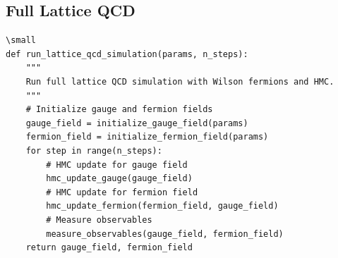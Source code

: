 \documentclass[12pt]{article}
\begin{document}
\subsection{Full Lattice QCD}
\begin{verbatim}
\small
def run_lattice_qcd_simulation(params, n_steps):
    """
    Run full lattice QCD simulation with Wilson fermions and HMC.
    """
    # Initialize gauge and fermion fields
    gauge_field = initialize_gauge_field(params)
    fermion_field = initialize_fermion_field(params)
    for step in range(n_steps):
        # HMC update for gauge field
        hmc_update_gauge(gauge_field)
        # HMC update for fermion field
        hmc_update_fermion(fermion_field, gauge_field)
        # Measure observables
        measure_observables(gauge_field, fermion_field)
    return gauge_field, fermion_field
\end{verbatim}
\end{document}
